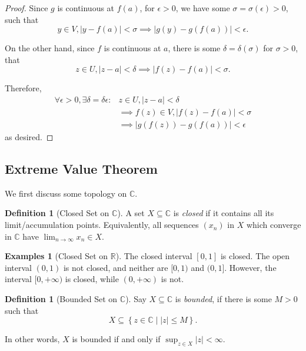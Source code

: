 \documentclass[11pt]{article}
\numberwithin{equation}{section}
\theoremstyle{definition}
\newtheorem{definition}[theorem]{Definition}
\newtheorem{examples}[theorem]{Examples}
\theoremstyle{remark}
\newcommand{\pqty}[1]{\left(#1\right)}
\newcommand{\abs}[1]{\left|#1\right|}
\newcommand{\set}[2]{\left\{#1\mid #2\right\}}
\newcommand{\ccintv}[2]{[#1,#2]}
\newcommand{\oointv}[2]{(#1,#2)}
\newcommand{\cointv}[2]{[#1,#2)}
\newcommand{\ocintv}[2]{(#1,#2]}
\newcommand{\RR}{\mathbb R}
\newcommand{\CC}{\mathbb C}
\newcommand{\plusinfty}{+\infty}
\begin{document}
\begin{proof}
    Since \(g\) is continuous at \(f\pqty{a}\), for \(\epsilon > 0\), we have some \(\sigma = \sigma\pqty{\epsilon} > 0\), such that
    \[
        y \in V, \abs{y - f\pqty{a}} < \sigma \implies \abs{g\pqty{y} - g\pqty{f\pqty{a}}} < \epsilon.
    \]

    On the other hand, since \(f\) is continuous at \(a\), there is some \(\delta = \delta\pqty{\sigma}\) for \(\sigma > 0\), that
    \[
        z \in U, \abs{z - a} < \delta \implies \abs{f\pqty{z} - f\pqty{a}} < \sigma.
    \]

    Therefore,
    \begin{align*}
        \forall \epsilon > 0, \exists \delta = \delta{\epsilon}: & z \in U, \abs{z - a} < \delta \\
        & \implies f\pqty{z} \in V, \abs{f\pqty{z} - f\pqty{a}} < \sigma \\
        & \implies \abs{g\pqty{f\pqty{z}} - g\pqty{f\pqty{a}}} < \epsilon
    \end{align*}
    as desired.
\end{proof}

\subsection{Extreme Value Theorem}

We first discuss some topology on \(\CC\).

\begin{definition}[Closed Set on \(\CC\)]\label{analysis-unit-0086}
    \label{def:closed-set-c}%
    A set \(X \subseteq \CC\) is \emph{closed} if it contains all its limit/accumulation points. Equivalently, all sequences \(\pqty{x_n}\) in \(X\) which converge in \(\CC\) have \(\lim_{n \to \infty} x_n \in X\).
\end{definition}

\begin{examples}[Closed Set on \(\RR\)]\label{analysis-unit-0087}
    \label{ex:closed-set-r}%
    The closed interval \(\ccintv{0}{1}\) is closed. The open interval \(\oointv{0}{1}\) is not closed, and neither are \(\cointv{0}{1}\) and \(\ocintv{0}{1}\). However, the interval \(\cointv{0}{\plusinfty}\) is closed, while \(\oointv{0}{\plusinfty}\) is not.
\end{examples}

\begin{definition}[Bounded Set on \(\CC\)]\label{analysis-unit-0088}
    \label{def:bounded-set-c}%
    Say \(X \subseteq \CC\) is \emph{bounded}, if there is some \(M > 0\) such that
    \[
        X \subseteq \set{z \in \CC}{\abs{z} \leq M}.
    \]

    In other words, \(X\) is bounded if and only if \(\sup_{z \in X} \abs{z} < \infty\).
\end{definition}
\end{document}
